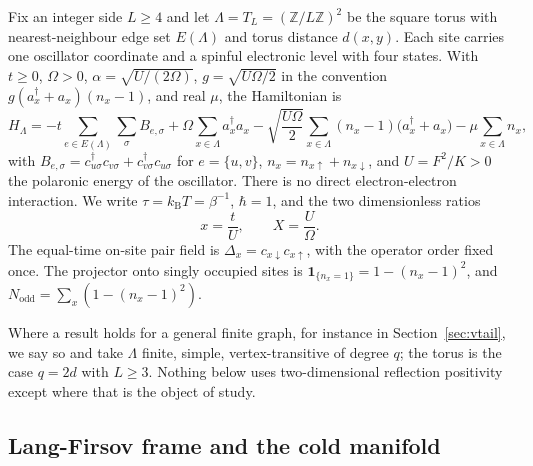 \documentclass[11pt]{article}
\theoremstyle{definition}
\theoremstyle{remark}
\newcommand{\Nodd}{N_{\mathrm{odd}}}
\newcommand{\Dop}{\Delta}
\begin{document}
Fix an integer side $L\ge4$ and let $\Lambda=T_{L}=(\mathbb{Z}/L\mathbb{Z})^{2}$
be the square torus with nearest-neighbour edge set $E(\Lambda)$ and torus
distance $d(x,y)$. Each site carries one oscillator coordinate and a spinful
electronic level with four states. With $t\ge0$, $\Omega>0$,
$\alpha=\sqrt{U/(2\Omega)}$, $g=\sqrt{U\Omega/2}$ in the convention
$g(a_{x}^{\dagger}+a_{x})(n_{x}-1)$, and real $\mu$, the Hamiltonian is
\cite{holstein1959}
\begin{equation}
H_{\Lambda}=-t\sum_{e\in E(\Lambda)}\sum_{\sigma}B_{e,\sigma}
+\Omega\sum_{x\in\Lambda}a_{x}^{\dagger}a_{x}
-\sqrt{\frac{U\Omega}{2}}\sum_{x\in\Lambda}(n_{x}-1)\bigl(a_{x}^{\dagger}+a_{x}\bigr)
-\mu\sum_{x\in\Lambda}n_{x},
\label{eq:H}
\end{equation}
with $B_{e,\sigma}=c_{u\sigma}^{\dagger}c_{v\sigma}+c_{v\sigma}^{\dagger}c_{u\sigma}$
for $e=\{u,v\}$, $n_{x}=n_{x\uparrow}+n_{x\downarrow}$, and $U=F^{2}/K>0$ the
polaronic energy of the oscillator. There is no direct electron-electron
interaction. We write $\tau=k_{\mathrm{B}}T=\beta^{-1}$, $\hbar=1$, and the two
dimensionless ratios
\begin{equation}
x=\frac{t}{U},\qquad X=\frac{U}{\Omega} .
\label{eq:ratios}
\end{equation}
The equal-time on-site pair field is $\Dop_{x}=c_{x\downarrow}c_{x\uparrow}$, with
the operator order fixed once. The projector onto singly occupied sites is
$\mathbf{1}_{\{n_{x}=1\}}=1-(n_{x}-1)^{2}$, and
$\Nodd=\sum_{x}(1-(n_{x}-1)^{2})$.

Where a result holds for a general finite graph, for instance in
Section~\ref{sec:vtail}, we say so and take $\Lambda$ finite, simple,
vertex-transitive of degree $q$; the torus is the case $q=2d$ with $L\ge3$.
Nothing below uses two-dimensional reflection positivity except where that is the
object of study.

\subsection{Lang-Firsov frame and the cold manifold}
\end{document}
